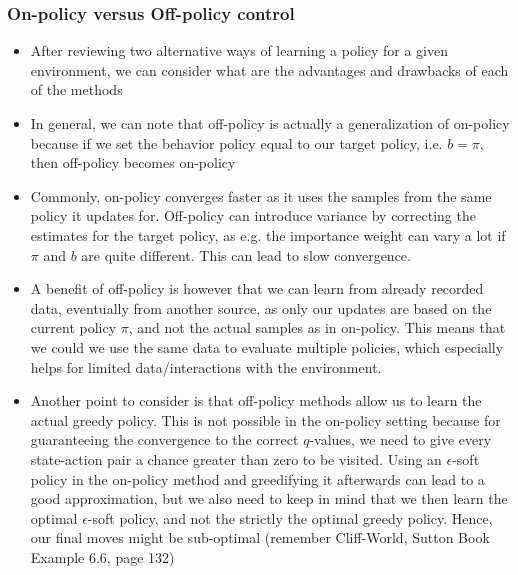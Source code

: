 \subsubsection{On-policy versus Off-policy control}
\label{sec:value_based_tabular_on_off_policy}
\begin{itemize}
	\item After reviewing two alternative ways of learning a policy for a given environment, we can consider what are the advantages and drawbacks of each of the methods
	\item In general, we can note that off-policy is actually a generalization of on-policy because if we set the behavior policy equal to our target policy, i.e. $b=\pi$, then off-policy becomes on-policy
	\item Commonly, on-policy converges faster as it uses the samples from the same policy it updates for. Off-policy can introduce variance by correcting the estimates for the target policy, as e.g. the importance weight can vary a lot if $\pi$ and $b$ are quite different. This can lead to slow convergence.
	\item A benefit of off-policy is however that we can learn from already recorded data, eventually from another source, as only our updates are based on the current policy $\pi$, and not the actual samples as in on-policy. This means that we could we use the same data to evaluate multiple policies, which especially helps for limited data/interactions with the environment.
	\item Another point to consider is that off-policy methods allow us to learn the actual greedy policy. This is not possible in the on-policy setting because for guaranteeing the convergence to the correct $q$-values, we need to give every state-action pair a chance greater than zero to be visited. Using an $\epsilon$-soft policy in the on-policy method and greedifying it afterwards can lead to a good approximation, but we also need to keep in mind that we then learn the optimal $\epsilon$-soft policy, and not the strictly the optimal greedy policy. Hence, our final moves might be sub-optimal (remember Cliff-World, Sutton Book Example 6.6, page 132)
\end{itemize}

